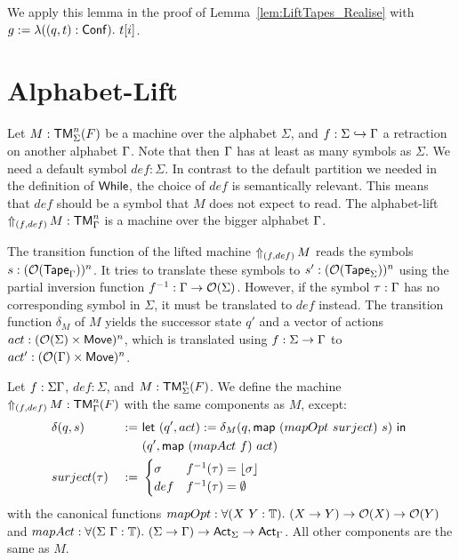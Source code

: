 We apply this lemma in the proof of Lemma~\ref{lem:LiftTapes_Realise} with $g := \lambda ((q,t):\Conf).~t[i]$.



\section{Alphabet-Lift}
\label{sec:sigma-Lift}
%

Let $M : \TM_\Sigma^n(F)$ be a machine over the alphabet $\Sigma$, and $f : \Sigma \hookrightarrow \Tau$ a retraction on another alphabet $\Tau$.
Note that then $\Tau$ has at least as many symbols as $\Sigma$.  We need a default symbol $def:\Sigma$.  In contrast to the default partition we
needed in the definition of $\While$, the choice of $def$ is semantically relevant.  This means that $def$ should be a symbol that $M$ does not expect
to read.  The alphabet-lift $\LiftAlphabet{M}{(f,def)} : \TM_\Tau^n$ is a machine over the bigger alphabet $\Tau$.

The transition function of the lifted machine $\LiftAlphabet{M}{(f,def)}$ reads the symbols \\$s :
(\Option(\Tape_\Tau))^n$.  It tries to translate these symbols to $s':(\Option(\Tape_\Sigma))^n$ using the partial inversion function $f^{-1} : \Tau
\to \Option(\Sigma)$.  However, if the symbol $\tau:\Tau$ has no corresponding symbol in $\Sigma$, it must be translated to
$def$ instead.  The transition function $\delta_M$ of $M$ yields the successor state $q'$ and a vector of actions $act: (\Option(\Sigma) \times
\MS{Move})^n$, which is translated using $f:\Sigma\to\Tau$ to $act' : (\Option(\Tau) \times \MS{Move})^n$.

\begin{definition}
  \label{def:LiftAlphabet}
  Let $f : \Sigma \Tau$, $def:\Sigma$, and $M : \TM_\Sigma^n(F)$.  We define the machine %
  $\LiftAlphabet{M}{(f,def)} : \TM_\Tau^n(F)$ with the same components as $M$, except:
  \begin{alignat*}{2}
    &\delta(q,s)    &~:=~& \Let{(q', act) := \delta_M(q, \map{(mapOpt~surject)}{s})}{\\%
    &               &~  ~& (q', \map{(mapAct~f)}{act})} \\
    & surject(\tau) &~:=~&
    \begin{cases}
      \sigma & f^{-1}(\tau) = \Some{\sigma} \\
      def & f^{-1}(\tau) = \None
    \end{cases}
  \end{alignat*}
  with the canonical functions $mapOpt: \forall (X~Y:\Type).~ (X \to Y) \to \Option(X) \to \Option(Y)$ and
  $mapAct : \forall (\Sigma~\Tau:\Type).~(\Sigma\to\Tau) \to \Act_\Sigma \to \Act_\Tau$.  All other components are the same as $M$.
\end{definition}


